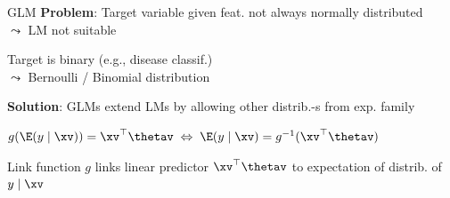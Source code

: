 \documentclass[10pt,compress,t,notes=noshow, xcolor=table]{beamer}
\begin{document}

\begin{framev}[align=top]{GLM }
\textbf{Problem}: Target variable given feat. not always normally distributed\\
$\leadsto$ LM not suitable
\begin{itemizeM}
\item Target is binary (e.g., disease classif.)\\
$\leadsto$ Bernoulli / Binomial distribution
\end{itemizeM}
\pause
\textbf{Solution}: GLMs extend LMs by allowing other distrib.-s from exp. family\\
\spacer[0.25]
\centerline{$g(\E(y \mid \xv)) = \xv^\top \thetav \; \Leftrightarrow \; \E(y \mid \xv) = g^{-1}(\xv^\top \thetav)$}
\spacer[0.25]
\begin{itemizeM}
\item Link function $g$ links linear predictor $\xv^\top \thetav$ to expectation of distrib. of $y \mid \xv$\\ %

\end{itemizeM}
\end{framev}
\end{document}
